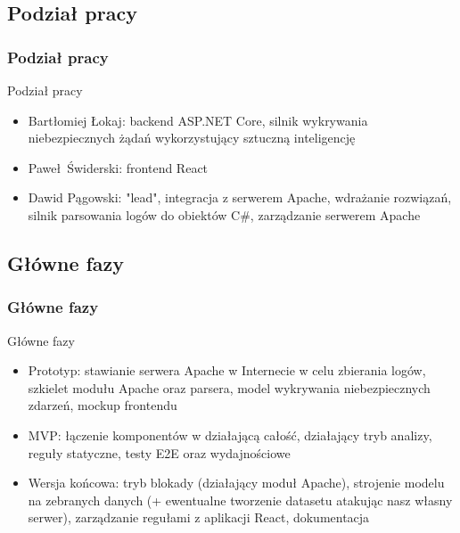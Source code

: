 \documentclass[10pt,xcolor=table]{beamer}
\begin{document}
\subsection{Podział pracy}
\begin{frame}
    \frametitle{Podział pracy}
    \begin{block}{Podział pracy}
    \begin{itemize}
        \item Bartłomiej Łokaj: backend ASP.NET Core, silnik wykrywania niebezpiecznych żądań wykorzystujący sztuczną inteligencję
        \item Paweł Świderski: frontend React
        \item Dawid Pągowski: "lead", integracja z serwerem Apache, wdrażanie rozwiązań, silnik parsowania logów do obiektów C\#, zarządzanie serwerem Apache
    \end{itemize}
    \end{block}  
\end{frame}
\subsection{Główne fazy}
\begin{frame}
    \frametitle{Główne fazy}
    \begin{block}{Główne fazy}
    \begin{itemize}
        \item Prototyp: stawianie serwera Apache w Internecie w celu zbierania logów, szkielet modułu Apache oraz parsera, model wykrywania niebezpiecznych zdarzeń, mockup frontendu
        \item MVP: łączenie komponentów w działającą całość, działający tryb analizy, reguły statyczne, testy E2E oraz wydajnościowe
        \item Wersja końcowa: tryb blokady (działający moduł Apache), strojenie modelu na zebranych danych (+ ewentualne tworzenie datasetu atakując nasz własny serwer), zarządzanie regułami z aplikacji React, dokumentacja
    \end{itemize}
    \end{block}  
\end{frame}
\end{document}
